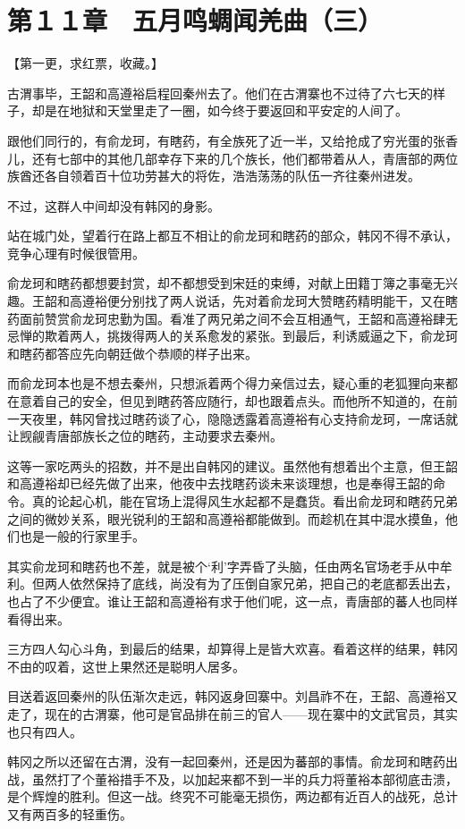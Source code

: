 \section{第１１章　五月鸣蜩闻羌曲（三）}

【第一更，求红票，收藏。】

古渭事毕，王韶和高遵裕启程回秦州去了。他们在古渭寨也不过待了六七天的样子，却是在地狱和天堂里走了一圈，如今终于要返回和平安定的人间了。

跟他们同行的，有俞龙珂，有瞎药，有全族死了近一半，又给抢成了穷光蛋的张香儿，还有七部中的其他几部幸存下来的几个族长，他们都带着从人，青唐部的两位族酋还各自领着百十位功劳甚大的将佐，浩浩荡荡的队伍一齐往秦州进发。

不过，这群人中间却没有韩冈的身影。

站在城门处，望着行在路上都互不相让的俞龙珂和瞎药的部众，韩冈不得不承认，竞争心理有时候很管用。

俞龙珂和瞎药都想要封赏，却不都想受到宋廷的束缚，对献上田籍丁簿之事毫无兴趣。王韶和高遵裕便分别找了两人说话，先对着俞龙珂大赞瞎药精明能干，又在瞎药面前赞赏俞龙珂忠勤为国。看准了两兄弟之间不会互相通气，王韶和高遵裕肆无忌惮的欺着两人，挑拨得两人的关系愈发的紧张。到最后，利诱威逼之下，俞龙珂和瞎药都答应先向朝廷做个恭顺的样子出来。

而俞龙珂本也是不想去秦州，只想派着两个得力亲信过去，疑心重的老狐狸向来都在意着自己的安全，但见到瞎药答应随行，却也跟着点头。而他所不知道的，在前一天夜里，韩冈曾找过瞎药谈了心，隐隐透露着高遵裕有心支持俞龙珂，一席话就让觊觎青唐部族长之位的瞎药，主动要求去秦州。

这等一家吃两头的招数，并不是出自韩冈的建议。虽然他有想着出个主意，但王韶和高遵裕却已经先做了出来，他夜中去找瞎药谈未来谈理想，也是奉得王韶的命令。真的论起心机，能在官场上混得风生水起都不是蠢货。看出俞龙珂和瞎药兄弟之间的微妙关系，眼光锐利的王韶和高遵裕都能做到。而趁机在其中混水摸鱼，他们也是一般的行家里手。

其实俞龙珂和瞎药也不差，就是被个‘利’字弄昏了头脑，任由两名官场老手从中牟利。但两人依然保持了底线，尚没有为了压倒自家兄弟，把自己的老底都丢出去，也占了不少便宜。谁让王韶和高遵裕有求于他们呢，这一点，青唐部的蕃人也同样看得出来。

三方四人勾心斗角，到最后的结果，却算得上是皆大欢喜。看着这样的结果，韩冈不由的叹着，这世上果然还是聪明人居多。

目送着返回秦州的队伍渐次走远，韩冈返身回寨中。刘昌祚不在，王韶、高遵裕又走了，现在的古渭寨，他可是官品排在前三的官人——现在寨中的文武官员，其实也只有四人。

韩冈之所以还留在古渭，没有一起回秦州，还是因为蕃部的事情。俞龙珂和瞎药出战，虽然打了个董裕措手不及，以加起来都不到一半的兵力将董裕本部彻底击溃，是个辉煌的胜利。但这一战。终究不可能毫无损伤，两边都有近百人的战死，总计又有两百多的轻重伤。

